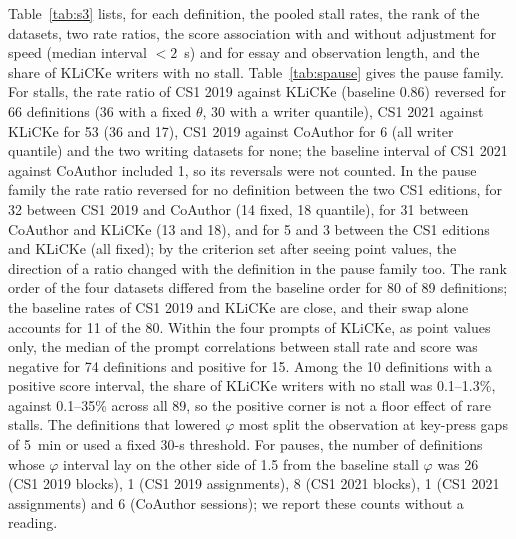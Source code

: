 Table~\ref{tab:s3} lists, for each definition, the pooled stall rates, the rank of the datasets, two rate ratios, the
score association with and without adjustment for speed (median interval $< 2$~s) and for essay and observation
length, and the share of KLiCKe writers with no stall. Table~\ref{tab:spause} gives the pause family. For stalls, the rate ratio of CS1 2019 against KLiCKe (baseline 0.86) reversed for 66
definitions (36 with a fixed $\theta$, 30 with a writer quantile), CS1 2021 against KLiCKe for 53 (36 and 17), CS1 2019
against CoAuthor for 6 (all writer quantile) and the two writing datasets for none; the baseline interval of CS1 2021
against CoAuthor included 1, so its reversals were not counted. In the pause family the rate ratio reversed for no definition between
the two CS1 editions, for 32 between CS1 2019 and CoAuthor (14 fixed, 18 quantile), for 31 between CoAuthor and KLiCKe
(13 and 18), and for 5 and 3 between the CS1 editions and KLiCKe (all fixed); by the criterion set after seeing point
values, the direction of a ratio changed with the definition in the pause family too. The rank order
of the four datasets differed from the baseline order for 80 of 89 definitions; the baseline rates of CS1 2019 and
KLiCKe are close, and their swap alone accounts for 11 of the 80. Within the four prompts of KLiCKe, as point values only, the median of the
prompt correlations between stall rate and score was negative for 74 definitions and positive for 15. Among the 10
definitions with a positive score interval, the share of KLiCKe writers with no stall was 0.1--1.3\%, against
0.1--35\% across all 89, so the positive corner is not a floor effect of rare stalls. The definitions that lowered
$\varphi$ most split the observation at key-press gaps of 5~min or used a fixed 30-s threshold. For pauses,
the number of definitions whose $\varphi$ interval lay on the other side of 1.5 from the baseline stall $\varphi$ was 26
(CS1 2019 blocks), 1 (CS1 2019 assignments), 8 (CS1 2021 blocks), 1 (CS1 2021 assignments) and 6 (CoAuthor sessions);
we report these counts without a reading.

